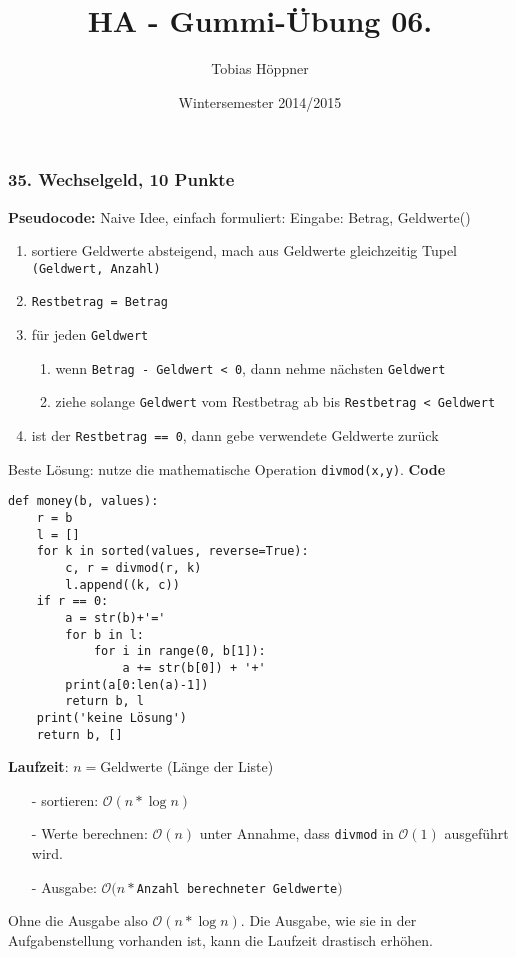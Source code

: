 \documentclass[ngerman,a4paper]{report}
\author{Tobias Höppner}
\title{HA - Gummi-Übung 06.}
\date{Wintersemester 2014/2015}
\renewcommand{\maketitle}{}
\begin{document}
 
\maketitle 

\subsubsection*{35. Wechselgeld, 10 Punkte}
\textbf{Pseudocode:} Naive Idee, einfach formuliert:
Eingabe: Betrag, Geldwerte()
\begin{enumerate}
\item sortiere Geldwerte absteigend, mach aus Geldwerte gleichzeitig Tupel \lstinline!(Geldwert, Anzahl)!
\item \lstinline!Restbetrag = Betrag!
\item für jeden \lstinline!Geldwert!
\begin{enumerate}
\item wenn \lstinline!Betrag - Geldwert < 0!, dann nehme nächsten \lstinline!Geldwert!
\item ziehe solange \lstinline!Geldwert! vom Restbetrag ab bis \lstinline!Restbetrag < Geldwert!
\end{enumerate}
\item ist der \lstinline!Restbetrag == 0!, dann gebe verwendete Geldwerte zurück
\end{enumerate}
Beste Lösung: nutze die mathematische Operation \lstinline!divmod(x,y)!. 
\textbf{Code}
\begin{lstlisting}
def money(b, values):
    r = b
    l = []
    for k in sorted(values, reverse=True):
        c, r = divmod(r, k)
        l.append((k, c))
    if r == 0:
        a = str(b)+'='
        for b in l:
            for i in range(0, b[1]):
                a += str(b[0]) + '+'
        print(a[0:len(a)-1])
        return b, l
    print('keine Lösung')
    return b, []
\end{lstlisting}
\textbf{Laufzeit}: $n = $Geldwerte (Länge der Liste)
\begin{enumerate}
\item[-] sortieren: $\mathcal{O}(n * \log n)$
\item[-] Werte berechnen: $\mathcal{O}(n)$ unter Annahme, dass \lstinline!divmod! in $\mathcal{O}(1)$ ausgeführt wird.
\item[-] Ausgabe: $\mathcal{O}(n * $\lstinline!Anzahl berechneter Geldwerte!$)$
\end{enumerate}
Ohne die Ausgabe also $\mathcal{O}(n * \log n)$. Die Ausgabe, wie sie in der Aufgabenstellung vorhanden ist, kann die Laufzeit drastisch erhöhen.\\
\end{document}
